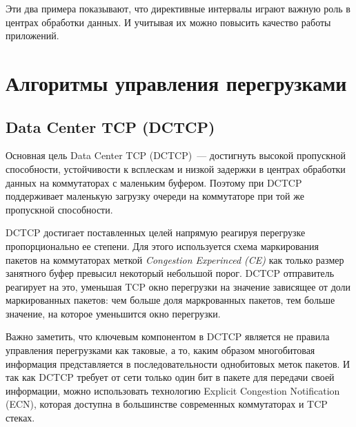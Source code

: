 \documentclass[14pt, a4paper,oneside]{extarticle}
\begin{document}
Эти два примера показывают, что директивные интервалы играют важную роль в центрах обработки данных. И учитывая их можно повысить качество работы приложений.
\newpage

\section{Алгоритмы управления перегрузками}
\subsection{Data Center TCP (DCTCP)}
Основная цель Data Center TCP (DCTCP)~--- достигнуть высокой пропускной способности, устойчивости к всплескам и низкой задержки в центрах обработки данных на коммутаторах с маленьким буфером. Поэтому при DCTCP поддерживает маленькую загрузку очереди на коммутаторе при той же пропускной способности.

DCTCP достигает поставленных целей напрямую реагируя перегрузке пропорционально ее степени. Для этого используется схема маркирования пакетов на коммутаторах меткой \emph{Congestion Experinced (CE)} как только размер занятного буфер превысил некоторый небольшой порог. DCTCP отправитель реагирует на это, уменьшая TCP окно перегрузки на значение зависящее от доли маркированных пакетов: чем больше доля маркрованных пакетов, тем больше значение, на которое уменьшится окно перегрузки.

Важно заметить, что ключевым компонентом в DCTCP является не правила управления перегрузками как таковые, а то, каким образом многобитовая информация представляется в последовательности однобитовых меток пакетов. И так как DCTCP требует от сети только один бит в пакете для передачи своей информации, можно использовать технологию Explicit Congestion Notification (ECN), которая доступна в большинстве современных коммутаторах и TCP стеках.
\end{document}

